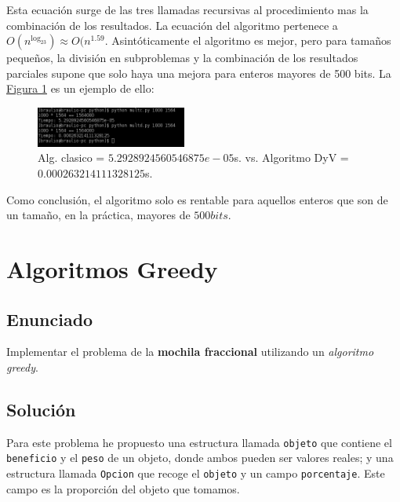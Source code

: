 \documentclass[10pt,a4paper,spanish]{report}
\theoremstyle{definition}
\theoremstyle{remark}
\begin{document}
Esta ecuación surge de las tres llamadas recursivas al procedimiento mas la combinación de los resultados. La ecuación del algoritmo pertenece a $O(n^{\log_23}) \approx O(n^{1.59}$. Asintóticamente el algoritmo es mejor, pero para tamaños pequeños, la división en subproblemas y la combinación de los resultados parciales supone que solo haya una mejora para enteros mayores de 500 bits. La \hyperref[figura2]{Figura \ref*{figura2}} es un ejemplo de ello:

\begin{center}
\begin{figure}[!h]
\centering
\includegraphics[width=0.44\textwidth]{figura2}
\caption{Alg. clasico = $5.2928924560546875e-05$s. vs. Algoritmo DyV = $0.000263214111328125$s.}
\label{figura2}
\end{figure}
\end{center}


Como conclusión, el algoritmo solo es rentable para aquellos enteros que son de un tamaño, en la práctica, mayores de $500bits$.

\section{\textcolor[rgb]{0.1,0.2,1}Algoritmos \textcolor[rgb]{0.1,0.2,1}Greedy}

\subsection{\textcolor[rgb]{0.1,0.2,1}Enunciado}

Implementar el problema de la \textbf{\textcolor[rgb]{0.1,0.2,1}{mochila fraccional}} utilizando un \textit{\textcolor[rgb]{0.1,0.2,1}{algoritmo greedy}}.

\subsection{\textcolor[rgb]{0.1,0.2,1}Solución}

Para este problema he propuesto una estructura llamada \verb|objeto| que contiene el \verb|beneficio| y el \verb|peso| de un objeto, donde ambos pueden ser valores reales; y una estructura llamada \verb|Opcion| que recoge el \verb|objeto| y un campo \verb|porcentaje|. Este campo es la proporción del objeto que tomamos.
\end{document}
